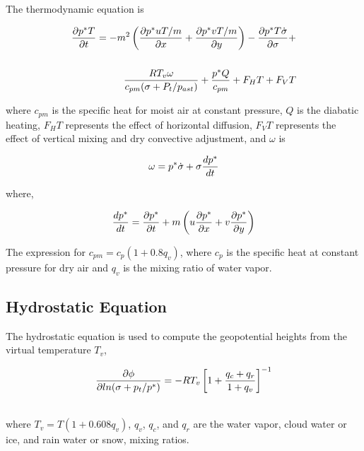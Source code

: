 The thermodynamic equation is

\begin{eqnarray} \nonumber
{{\partial{p^{\ast}T} \over \partial{t}}} = -m^2 \left( {\partial{p^{\ast}uT/m}
\over \partial{x}} + {\partial{p^{\ast}vT/m} \over \partial{y}} \right) -
{\partial{p^{\ast}T\dot{\sigma}} \over \partial{\sigma}} +  \\ \nonumber \\
{RT_v\omega \over c_{pm}(\sigma + P_t/p_{ast})} + {p^{\ast}Q \over c_{pm}} +
F_HT + F_VT
\end{eqnarray}

where $c_{pm}$ is the specific heat for
moist air at constant pressure, $Q$ is the diabatic heating, $F_HT$ represents
the effect of horizontal diffusion, $F_VT$ represents the effect of vertical
mixing and dry convective adjustment, and $\omega$ is

\begin{eqnarray}
\omega = p^{\ast} \dot{\sigma} + \sigma {dp^{\ast} \over dt}
\end{eqnarray}

where,
  
\begin{eqnarray}
{dp^{\ast} \over dt} =
{\partial{p^{\ast}} \over \partial{t}} + m \left( u {\partial{p^{\ast}} \over
\partial{x}} + v {\partial{p^{\ast}} \over \partial{y}} \right)
\end{eqnarray}

The expression for $c_{pm} = c_p(1+0.8q_v)$, where $c_p$
is the specific heat at constant pressure for dry air and $q_v$ is the mixing
ratio of water vapor.

\subsection{Hydrostatic Equation}

\noindent The hydrostatic equation is
used to compute the geopotential heights from the virtual temperature $T_v$,

\begin{eqnarray}
{\partial{\phi} \over \partial l n (\sigma + p_t / p^{\ast})} =
-RT_v \left[ 1 + {q_c + q_r \over 1 + q_v} \right]^{-1}
\end{eqnarray}

\noindent \\ where $T_v = T(1 + 0.608q_v)$, $q_v$, $q_c$, and $q_r$ are the
water vapor, cloud water or ice, and rain water or snow, mixing ratios.  

\newpage

